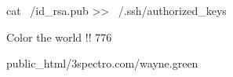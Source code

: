 



cat ~/id_rsa.pub >> ~/.ssh/authorized_keys

Color the world !! 776

public_html/3spectro.com/wayne.green
